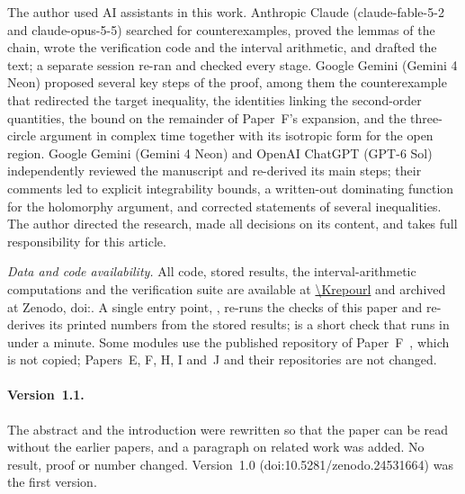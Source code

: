\begin{acknowledgments}
The author used AI assistants in this work. Anthropic Claude (claude-fable-5-2 and claude-opus-5-5) searched for counterexamples, proved the lemmas of the chain, wrote the verification code and the interval arithmetic, and drafted the text; a separate session re-ran and checked every stage. Google Gemini (Gemini 4 Neon) proposed several key steps of the proof, among them the counterexample that redirected the target inequality, the identities linking the second-order quantities, the bound on the remainder of Paper~F's expansion, and the three-circle argument in complex time together with its isotropic form for the open region. Google Gemini (Gemini 4 Neon) and OpenAI ChatGPT (GPT-6 Sol) independently reviewed the manuscript and re-derived its main steps; their comments led to explicit integrability bounds, a written-out dominating function for the holomorphy argument, and corrected statements of several inequalities. The author directed the research, made all decisions on its content, and takes full responsibility for this article.
\end{acknowledgments}

\emph{Data and code availability.}
All code, stored results, the interval-arithmetic computations and the verification suite are available at \url{\Krepourl} and archived at Zenodo, doi:\Kcodedoi.
A single entry point, , re-runs the checks of this paper and re-derives its printed numbers from the stored results;  is a short check that runs in under a minute.
Some modules use the published repository of Paper~F~\cite{Fcode}, which is not copied; Papers~E, F, H, I and~J and their repositories are not changed.

\paragraph*{Version~1.1.}
The abstract and the introduction were rewritten so that the paper can be read without the earlier papers, and a paragraph on related work was added.
No result, proof or number changed.
Version~1.0 (doi:10.5281/zenodo.24531664) was the first version.
